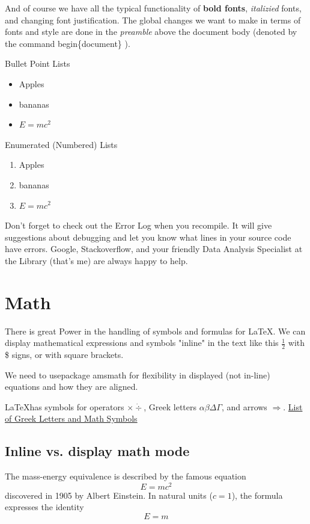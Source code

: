 \documentclass{article}
\begin{document}
And of course we have all the typical functionality of \textbf{bold fonts}, \textit{italizied} fonts, and changing font justification.  The global changes we want to make in terms of fonts and style are done in the \emph{preamble} above the document body (denoted by the command begin\{document\} ).

Bullet Point Lists
\begin{itemize}
    \item Apples
    \item bananas
    \item $E=mc^2$
\end{itemize}

Enumerated (Numbered) Lists
\begin{enumerate}
    \item Apples
    \item bananas
    \item $E=mc^2$
\end{enumerate}

Don't forget to check out the Error Log when you recompile.  It will give suggestions about debugging and let you know what lines in your source code have errors.  Google, Stackoverflow, and your friendly Data Analysis Specialist at the Library (that's me) are always happy to help.


\section{Math}
There is great Power in the handling of symbols and formulas for LaTeX.  We can display mathematical expressions and symbols "inline" in the text like this $\frac{1}{2}$ with \$ signs, or with square brackets.

We need to usepackage amsmath for flexibility in displayed (not in-line) equations and how they are aligned.

\LaTeX has symbols for operators $\times \dot \div$, Greek letters $\alpha \beta \Delta \Gamma$, and arrows $\Rightarrow$.
\href{https://www.overleaf.com/learn/latex/List_of_Greek_letters_and_math_symbols}{List of Greek Letters and Math Symbols}


\subsection{Inline vs. display math mode}
The mass-energy equivalence is described by the famous equation \[ E=mc^2 \]
discovered in 1905 by Albert Einstein.
In natural units ($c = 1$), the formula expresses the identity
\begin{equation}
E=m
\end{equation}
\end{document}
